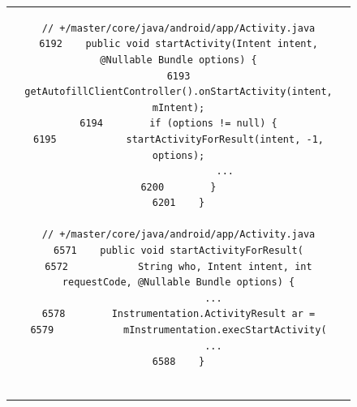 {%

\begin{figure}[htbp]
\centering
\begin{tabular}{c}
\begin{lstlisting}
// +/master/core/java/android/app/Activity.java
6192    public void startActivity(Intent intent, @Nullable Bundle options) {
6193        getAutofillClientController().onStartActivity(intent, mIntent);
6194        if (options != null) {
6195            startActivityForResult(intent, -1, options);
                ...
6200        }
6201    }

// +/master/core/java/android/app/Activity.java
6571    public void startActivityForResult(
6572            String who, Intent intent, int requestCode, @Nullable Bundle options) {
            ...
6578        Instrumentation.ActivityResult ar =
6579            mInstrumentation.execStartActivity(
            ...
6588    }


\end{lstlisting}
\end{tabular}
\end{figure}}
